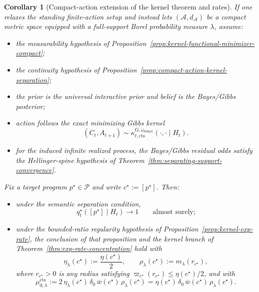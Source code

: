 \documentclass[11pt]{article}
\newtheorem{corollary}[theorem]{Corollary}
\theoremstyle{definition}
\theoremstyle{remark}
\newcommand{\Acal}{\mathcal{A}}
\newcommand{\Pcal}{\mathcal{P}}
\begin{document}
\begin{corollary}[Compact-action extension of the kernel theorem and rates]
\label{cor:compact-action-kernel}
If one relaxes the standing finite-action setup and instead lets $(\Acal,d_\Acal)$ be a compact metric space equipped with a full-support Borel probability measure $\lambda$, assume:
\begin{itemize}
\item[(i)] the measurability hypothesis of Proposition~\ref{prop:kernel-functional-minimizer-compact};
\item[(ii)] the continuity hypothesis of Proposition~\ref{prop:compact-action-kernel-separation};
\item[(iii)] the prior is the universal interactive prior and belief is the Bayes/Gibbs posterior;
\item[(iv)] action follows the exact minimizing Gibbs kernel
\[
(C_t,A_{t+1})\sim \kappa_{t,\mathrm{cts}}^{\mathrm G,\omega_{\mathrm{behav}}}(\cdot,\cdot\mid H_t).
\]
\item[(v)] for the induced infinite realized process, the Bayes/Gibbs residual odds satisfy the Hellinger-spine hypothesis of Theorem~\ref{thm:separating-support-convergence}.
\end{itemize}
Fix a target program $p^\star\in\Pcal$ and write $c^\star:=[p^\star]$. Then:
\begin{itemize}
\item[(a)] under the semantic separation condition,
\[
q_t^\star([p^\star]\mid H_t)\longrightarrow 1
\qquad\text{almost surely;}
\]
\item[(b)] under the bounded-ratio regularity hypothesis of Proposition~\ref{prop:kernel-exp-rate}, the conclusion of that proposition and the kernel branch of Theorem~\ref{thm:exp-rate-concentration} hold with
\[
\eta_\lambda(c^\star):=\frac{\eta(c^\star)}{2},
\qquad
\rho_\lambda(c^\star):=m_\lambda(r_{c^\star}),
\]
where $r_{c^\star}>0$ is any radius satisfying $\varpi_{c^\star}(r_{c^\star})\le \eta(c^\star)/2$, and with
\[
\mu_{0,\lambda}^{\mathrm{cts}}
:=
2\,\eta_\lambda(c^\star)\,\delta_0\,\bar w(c^\star)\,\rho_\lambda(c^\star)
=
\eta(c^\star)\,\delta_0\,\bar w(c^\star)\,\rho_\lambda(c^\star).
\]
\end{itemize}
\end{corollary}
\end{document}
